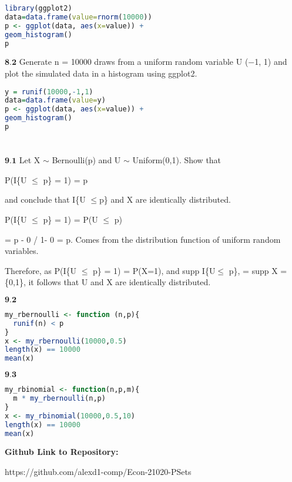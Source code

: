 \begin{lstlisting}[language=R]
library(ggplot2)
data=data.frame(value=rnorm(10000))
p <- ggplot(data, aes(x=value)) + 
geom_histogram()
p
\end{lstlisting}


$\textbf{8.2}$
Generate n = 10000 draws from a uniform random variable U (−1, 1) and plot the simulated data in a histogram using ggplot2.
\begin{lstlisting}[language=R]
y = runif(10000,-1,1)
data=data.frame(value=y)
p <- ggplot(data, aes(x=value)) + 
geom_histogram()
p
\end{lstlisting}

\newpage
\section{}

$\textbf{9.1}$ Let X $\sim$ Bernoulli(p) and U $\sim$ Uniform(0,1). Show that

P(I{\{U $\leq$ p}\} = 1) = p

and conclude that I\{U $\leq$p\} and X are identically distributed. 

P(I{\{U $\leq$ p}\} = 1) = P(U $\leq$ p)

= p - 0 / 1- 0  = p. Comes from the distribution function of uniform random variables.

Therefore, as P(I{\{U $\leq$ p}\} = 1) = P(X=1), and supp I\{U$\leq$ p\}, = supp X = \{0,1\}, it follows that U and X are identically distributed.

$\textbf{9.2}$

\begin{lstlisting}[language=R]
my_rbernoulli <- function (n,p){
  runif(n) < p
}
x <- my_rbernoulli(10000,0.5)
length(x) == 10000
mean(x)
\end{lstlisting}

$\textbf{9.3}$

\begin{lstlisting}[language=R]
my_rbinomial <- function(n,p,m){
  m * my_rbernoulli(n,p)
}
x <- my_rbinomial(10000,0.5,10)
length(x) == 10000
mean(x)
\end{lstlisting}


\newpage
\textbf{Github Link to Repository:}

https://github.com/alexd1-comp/Econ-21020-PSets




